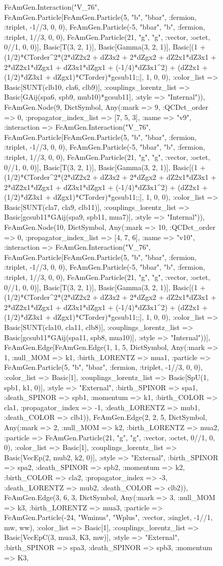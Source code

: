 \documentclass{revtex4}
\begin{document}
\begin{figure}[!htb]
\begin{center}
{FeAmGen.Interaction("V_76", FeAmGen.Particle[FeAmGen.Particle(5, "b", "bbar", :fermion, :triplet, -1//3, 0, 0), FeAmGen.Particle(-5, "bbar", "b", :fermion, :triplet, 1//3, 0, 0), FeAmGen.Particle(21, "g", "g", :vector, :octet, 0//1, 0, 0)], Basic[T(3, 2, 1)], Basic[Gamma(3, 2, 1)], Basic[(1 + (1/2)*CTorder^2*(2*dZ2x2 + dZ3x2 + 2*dZgx2 + dZ2x1*dZ3x1 + 2*dZ2x1*dZgx1 + dZ3x1*dZgx1 + (-1/4)*dZ3x1^2) + (dZ2x1 + (1/2)*dZ3x1 + dZgx1)*CTorder)*gcsub11;;], 1, 0, 0), :color_list => Basic[SUNT(clb10, cla6, clb9)], :couplings_lorentz_list => Basic[GAij(spa6, spb9, mub10)*gcsub11], :style => "Internal")), FeAmGen.Node(9, Dict{Symbol, Any}(:mark => 9, :QCDct_order => 0, :propagator_index_list => [7, 5, 3], :name => "v9", :interaction => FeAmGen.Interaction("V_76", FeAmGen.Particle[FeAmGen.Particle(5, "b", "bbar", :fermion, :triplet, -1//3, 0, 0), FeAmGen.Particle(-5, "bbar", "b", :fermion, :triplet, 1//3, 0, 0), FeAmGen.Particle(21, "g", "g", :vector, :octet, 0//1, 0, 0)], Basic[T(3, 2, 1)], Basic[Gamma(3, 2, 1)], Basic[(1 + (1/2)*CTorder^2*(2*dZ2x2 + dZ3x2 + 2*dZgx2 + dZ2x1*dZ3x1 + 2*dZ2x1*dZgx1 + dZ3x1*dZgx1 + (-1/4)*dZ3x1^2) + (dZ2x1 + (1/2)*dZ3x1 + dZgx1)*CTorder)*gcsub11;;], 1, 0, 0), :color_list => Basic[SUNT(cla7, cla9, clb11)], :couplings_lorentz_list => Basic[gcsub11*GAij(spa9, spb11, mua7)], :style => "Internal")), FeAmGen.Node(10, Dict{Symbol, Any}(:mark => 10, :QCDct_order => 0, :propagator_index_list => [4, 7, 6], :name => "v10", :interaction => FeAmGen.Interaction("V_76", FeAmGen.Particle[FeAmGen.Particle(5, "b", "bbar", :fermion, :triplet, -1//3, 0, 0), FeAmGen.Particle(-5, "bbar", "b", :fermion, :triplet, 1//3, 0, 0), FeAmGen.Particle(21, "g", "g", :vector, :octet, 0//1, 0, 0)], Basic[T(3, 2, 1)], Basic[Gamma(3, 2, 1)], Basic[(1 + (1/2)*CTorder^2*(2*dZ2x2 + dZ3x2 + 2*dZgx2 + dZ2x1*dZ3x1 + 2*dZ2x1*dZgx1 + dZ3x1*dZgx1 + (-1/4)*dZ3x1^2) + (dZ2x1 + (1/2)*dZ3x1 + dZgx1)*CTorder)*gcsub11;;], 1, 0, 0), :color_list => Basic[SUNT(cla10, cla11, clb8)], :couplings_lorentz_list => Basic[gcsub11*GAij(spa11, spb8, mua10)], :style => "Internal"))], FeAmGen.Edge[FeAmGen.Edge(1, 1, 5, Dict{Symbol, Any}(:mark => 1, :null_MOM => k1, :birth_LORENTZ => mua1, :particle => FeAmGen.Particle(5, "b", "bbar", :fermion, :triplet, -1//3, 0, 0), :color_list => Basic[1], :couplings_lorentz_list => Basic[SpU(1, spb1, k1, 0)], :style => "External", :birth_SPINOR => spa1, :death_SPINOR => spb1, :momentum => k1, :birth_COLOR => cla1, :propagator_index => -1, :death_LORENTZ => mub1, :death_COLOR => clb1)), FeAmGen.Edge(2, 2, 5, Dict{Symbol, Any}(:mark => 2, :null_MOM => k2, :birth_LORENTZ => mua2, :particle => FeAmGen.Particle(21, "g", "g", :vector, :octet, 0//1, 0, 0), :color_list => Basic[1], :couplings_lorentz_list => Basic[VecEp(2, mub2, k2, 0)], :style => "External", :birth_SPINOR => spa2, :death_SPINOR => spb2, :momentum => k2, :birth_COLOR => cla2, :propagator_index => -3, :death_LORENTZ => mub2, :death_COLOR => clb2)), FeAmGen.Edge(3, 6, 3, Dict{Symbol, Any}(:mark => 3, :null_MOM => k3, :birth_LORENTZ => mua3, :particle => FeAmGen.Particle(-24, "Wminus", "Wplus", :vector, :singlet, -1//1, mw, ww), :color_list => Basic[1], :couplings_lorentz_list => Basic[VecEpC(3, mua3, K3, mw)], :style => "External", :birth_SPINOR => spa3, :death_SPINOR => spb3, :momentum => K3, }
\end{center}
\end{figure}
\end{document}
